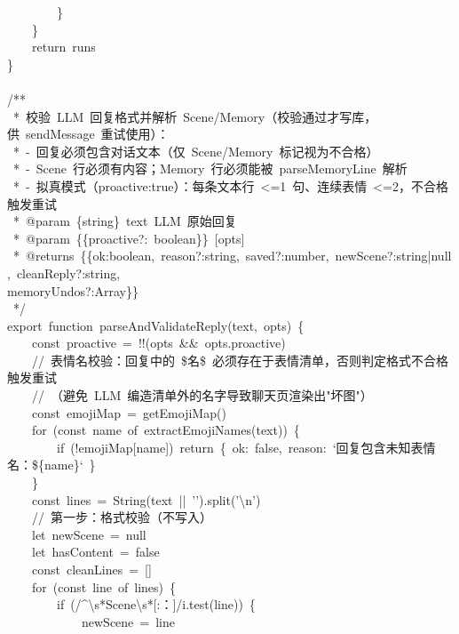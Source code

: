 \documentclass[a4paper,10pt]{article}
\begin{document}
{\ttfamily\footnotesize\raggedright
~~~~~~~~\}\\
~~~~\}\\
~~~~return~runs\\
\}\\
\mbox{}\\
/**\\
~*~校验~LLM~回复格式并解析~Scene/Memory（校验通过才写库，供~sendMessage~重试使用）：\\
~*~-~回复必须包含对话文本（仅~Scene/Memory~标记视为不合格）\\
~*~-~Scene~行必须有内容；Memory~行必须能被~parseMemoryLine~解析\\
~*~-~拟真模式（proactive:true）：每条文本行~<=1~句、连续表情~<=2，不合格触发重试\\
~*~@param~\{string\}~text~LLM~原始回复\\
~*~@param~\{\{proactive?:~boolean\}\}~[opts]\\
~*~@returns~\{\{ok:boolean,~reason?:string,~saved?:number,~newScene?:string|null,~cleanReply?:string,~\\
memoryUndos?:Array\}\}\\
~*/\\
export~function~parseAndValidateReply(text,~opts)~\{\\
~~~~const~proactive~=~!!(opts~\&\&~opts.proactive)\\
~~~~//~表情名校验：回复中的~\$名\$~必须存在于表情清单，否则判定格式不合格触发重试\\
~~~~//~（避免~LLM~编造清单外的名字导致聊天页渲染出"坏图"）\\
~~~~const~emojiMap~=~getEmojiMap()\\
~~~~for~(const~name~of~extractEmojiNames(text))~\{\\
~~~~~~~~if~(!emojiMap[name])~return~\{~ok:~false,~reason:~`回复包含未知表情名：\$\{name\}`~\}\\
~~~~\}\\
~~~~const~lines~=~String(text~||~'').split('\textbackslash{}n')\\
~~~~//~第一步：格式校验（不写入）\\
~~~~let~newScene~=~null\\
~~~~let~hasContent~=~false\\
~~~~const~cleanLines~=~[]\\
~~~~for~(const~line~of~lines)~\{\\
~~~~~~~~if~(/\textasciicircum{}\textbackslash{}s*Scene\textbackslash{}s*[:：]/i.test(line))~\{\\
~~~~~~~~~~~~newScene~=~line\\
}
\end{document}
